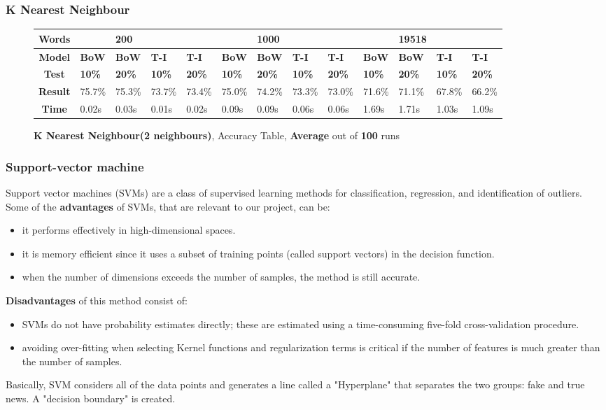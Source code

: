 \documentclass{article}
\begin{document}
	\subsubsection{K Nearest Neighbour}
	\begin{figure}[H]
		\begin{tabular}{||c||l|l|l|l||l|l|l|l||l|l|l|l||}
			\hline
			\textbf{Words} &  & \textbf{200} & & & &\textbf{1000} & & & & \textbf{19518} &  & \\ \hline 
			\textbf{Model} & \textbf{BoW} & \textbf{BoW} & \textbf{T-I} & \textbf{T-I} &\textbf{BoW} & \textbf{BoW} & \textbf{T-I} & \textbf{T-I} & \textbf{BoW} & \textbf{BoW} & \textbf{T-I} & \textbf{T-I}\\ \hline
			\textbf{Test} & \textbf{10\%} & \textbf{20\%} & \textbf{10\%} & \textbf{20\%} & \textbf{10\%} & \textbf{20\%} & \textbf{10\%} & \textbf{20\%} & \textbf{10\%} & \textbf{20\%} & \textbf{10\%} & \textbf{20\%} \\ \hline \hline  
			\textbf{Result} & 75.7\% & 75.3\% & 73.7\% & 73.4\% & 75.0\% & 74.2\% & 73.3\% & 73.0\% & 71.6\% & 71.1\% & 67.8\% & 66.2\% \\ \hline 
			\textbf{Time} &0.02s & 0.03s & 0.01s & 0.02s & 0.09s & 0.09s & 0.06s & 0.06s & 1.69s & 1.71s & 1.03s & 1.09s \\ \hline 
		\end{tabular}
		\caption{\textbf{K Nearest Neighbour(2 neighbours)}, Accuracy Table, \textbf{Average} out of \textbf{100} runs}
	\end{figure}

	\subsubsection{Support-vector machine}
	Support vector machines (SVMs) are a class of supervised learning methods for classification, regression, and identification of outliers. Some of the \textbf{advantages} of SVMs, that are relevant to our project, can be:
	\begin{itemize}
    \item it performs effectively in high-dimensional spaces.
    \item it is memory efficient since it uses a subset of training points (called support vectors) in the decision function.
    \item when the number of dimensions exceeds the number of samples, the method is still accurate.
    \end{itemize}
    \textbf{Disadvantages} of this method consist of:
    \begin{itemize}
    \item SVMs do not have probability estimates directly; these are estimated using a time-consuming five-fold cross-validation procedure.
    \item avoiding over-fitting when selecting Kernel functions and regularization terms is critical if the number of features is much greater than the number of samples.
    \end{itemize}
    Basically, SVM considers all of the data points and generates a line called a "Hyperplane" that separates the two groups: fake and true news. A "decision boundary" is created.
\end{document}
